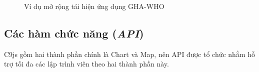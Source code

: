 \documentclass[12pt,a4paper]{article}
\begin{document}
\begin{figure}[!h]
	\begin{center}
    \caption{Ví dụ mở rộng tái hiện ứng dụng GHA-WHO}
    \label{fig:advance_1}
	\end{center}
\end{figure}
\subsection{Các hàm chức năng (\textit{API})}
C9js gồm hai thành phần chính là Chart và Map, nên API được tổ chức nhằm hỗ trợ tối đa các lập trình viên theo hai thành phần này.
\end{document}
